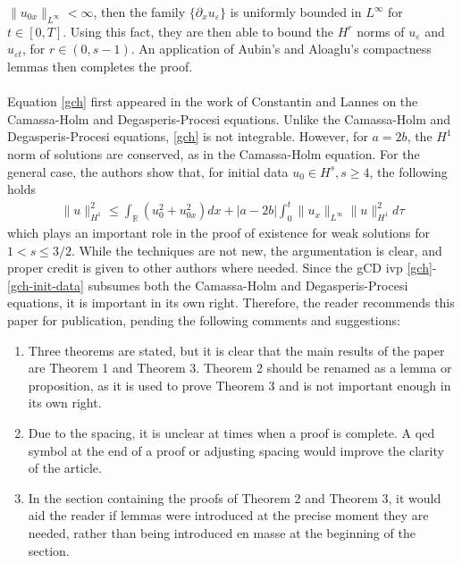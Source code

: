\documentclass[12pt,reqno]{amsart}
\numberwithin{equation}{section}  %
\numberwithin{figure}{section}
\newcommand{\rr}{\mathbb{R}}
\newcommand{\p}{\partial}
\newcommand{\ee}{\varepsilon}
\theoremstyle{plain}
\theoremstyle{definition}
\theoremstyle{remark}
\begin{document}
	$\|u_{0x}\|_{L^\infty} <\infty$, then the family
$\{\p_x u_{\ee} \}$ is uniformly bounded in $L^\infty$ for $t \in [0, T]$. 
Using this fact, they are then able to bound the $H^r$ norms of $u_{\ee}$ and
$u_{\ee t}$, for $r \in (0, s-1)$. An application of Aubin's and Aloaglu's
compactness lemmas then completes the proof.
\\
\\
Equation \eqref{gch} first appeared in the work
of Constantin and Lannes
\cite{Constantin-Lannes-2009-The-hydrodynamical-relevance-of-the-Camassa-Holm}
on the Camassa-Holm \cite{Camassa-Holm-1993-An-integrable-shallow-water} and
Degasperis-Procesi \cite{Degasperis-Procesi-1999-Asymptotic-integrability}
equations. 
Unlike the Camassa-Holm and Degasperis-Procesi equations, \eqref{gch} is not
integrable. However, for $a =2b$, the $H^1$ norm of
solutions are conserved, as in the Camassa-Holm equation. For the general case, the authors show that, for initial data $u_0 \in H^s, s \ge4$, the
following holds 
%
%
\begin{equation}
	\label{semi-conservation-law}
	\begin{split}
		\|u\|_{H^1}^2 \le \int_{\rr}\left( u_0^2 + u_{0x}^2 \right)dx + | a - 2b
		|\int_{0}^t \|u_x\|_{L^\infty} \|u\|_{H^1}^2 d \tau
	\end{split}
\end{equation}
%
%
which plays an important role in the proof of existence for weak solutions for
$1 < s \le 3/2$. While the techniques are not new, the argumentation is clear,
and proper credit is given to other authors where needed. Since the
gCD ivp \eqref{gch}-\eqref{gch-init-data} subsumes both the Camassa-Holm
and Degasperis-Procesi equations, it is important in its own right.
Therefore, the reader recommends this paper for publication, pending the
following comments and suggestions: %
%
\begin{enumerate}
	\item Three theorems are stated, but it is clear that the main results of 
		the paper are Theorem 1 and Theorem 3. Theorem 2 should be renamed as a
		lemma or proposition, as it is used to prove Theorem 3 and is not important
		enough in its own right. 
		\item Due to the spacing, it is unclear at times when a proof is complete.
			A qed symbol at the end of a proof or adjusting spacing would
			improve the clarity of the article. 
		\item In the section containing the proofs of Theorem 2 and Theorem 3,
			it would aid the reader if lemmas were introduced at the precise moment
			they are needed, rather than being introduced en masse at the beginning of
			the section.
\end{enumerate}
\end{document}
